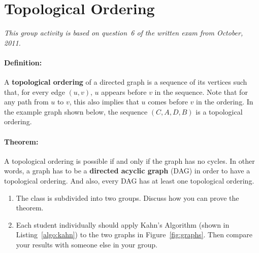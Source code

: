 \documentclass[a4paper]{article}
\begin{document}
\section{Topological Ordering}

\emph{This group activity is based on question~6 of the written exam from October, 2011.}

\paragraph{Definition:}
A \textbf{topological ordering} of a directed graph is a sequence of its vertices such that, for every edge $(u,v)$, $u$ appears before $v$ in the sequence.
Note that for any path from $u$ to $v$, this also implies that $u$ comes before $v$ in the ordering.
In the example graph shown below, the sequence $(C,A,D,B)$ is a topological ordering.

\begin{center}
\end{center}

\paragraph{Theorem:}
A topological ordering is possible if and only if the graph has no cycles.
In other words, a graph has to be a \textbf{directed acyclic graph} (DAG) in order to have a topological ordering.
And also, every DAG has at least one topological ordering.

\begin{enumerate}
\item
  The class is subdivided into two groups.
  Discuss how you can prove the theorem.
\item
  Each student individually should apply Kahn's Algorithm (shown in Listing~\ref{algo:kahn}) to the two graphs in Figure~\ref{fig:graphs}.
  Then compare your results with someone else in your group.
\end{enumerate}
\end{document}
